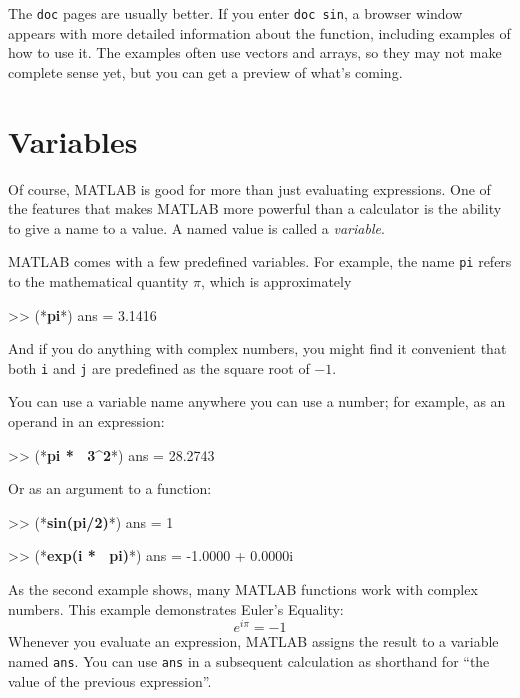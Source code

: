 
The \lstinline{doc} pages are usually better.  
If you enter \lstinline{doc sin}, a browser window appears with more detailed information about the function, including examples of how to use it.  The examples often
use vectors and arrays, so they may not make complete sense yet, 
but you can get a preview of what's coming.


\section{Variables}

Of course, MATLAB is good for more than just evaluating expressions. One of the features that makes MATLAB more powerful than a calculator
is the ability to give a name to a value.  A named value is called
a \emph{variable}.

 
MATLAB comes with a few predefined variables. For
example, the name \lstinline{pi} refers to the
mathematical quantity $\pi$, which is approximately

\begin{code}
>> (*\textbf{pi}*)
ans = 3.1416
\end{code}

And if you do anything with complex numbers, you might find it
convenient that both \lstinline{i} and \lstinline{j} are predefined as the square
root of $-1$.


You can use a variable name anywhere you can use a number; for example, as
an operand in an expression:

\begin{code}
>> (*\textbf{pi * ~3\^{}2}*)
ans = 28.2743
\end{code}

Or as an argument to a function:

\begin{code}
>> (*\textbf{sin(pi/2)}*)
ans = 1

>> (*\textbf{exp(i * ~pi)}*)
ans = -1.0000 + 0.0000i
\end{code}


As the second example shows, many MATLAB functions work with
complex numbers.  This example demonstrates Euler's Equality:
%
\begin{equation*}
e^{i \pi} = -1
\end{equation*}
%
Whenever you evaluate an expression, MATLAB assigns the result to
a variable named \lstinline{ans}.  You can use \lstinline{ans} in a subsequent
calculation as shorthand for ``the value of the previous expression''.

